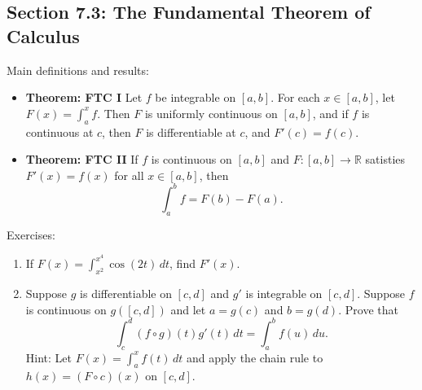 \documentclass[letterpaper,12pt]{article}
\newcommand{\R}{\mathbb{R}}
\begin{document}
\subsection*{Section 7.3: The Fundamental Theorem of Calculus}
Main definitions and results:
\begin{itemize}
 \item {\bf Theorem: FTC I} Let $f$ be integrable on $[a,b]$. For each $x\in [a,b]$, let $F(x) = \int_a^x f$. Then $F$ is uniformly continuous on $[a,b]$, and if $f$ is continuous at $c$, then $F$ is differentiable at $c$, and $F'(c)=f(c)$.
 \item {\bf Theorem: FTC II} If $f$ is continuous on $[a,b]$ and $F:[a,b]\to\R$ satisties $F'(x) = f(x)$ for all $x\in [a,b]$, then
\[
 \int_a^b f = F(b)-F(a).
\] 
\end{itemize}

\noindent Exercises:
\begin{enumerate}
 \item If $F(x) = \int_{x^2}^{x^4}\cos(2t)\,dt$, find $F'(x)$.
 \item Suppose $g$ is differentiable on $[c,d]$ and $g'$ is integrable on $[c,d]$. Suppose $f$ is continuous on $g([c,d])$ and let $a=g(c)$ and $b=g(d)$. Prove that
\[
 \int_c^d (f\circ g)(t)g'(t)\,dt = \int_a^b f(u)\,du.
\]
Hint: Let $F(x) = \int_a^x f(t)\,dt$ and apply the chain rule to $h(x) = (F\circ c)(x)$ on $[c,d]$.
\end{enumerate}
\newpage
\end{document}
